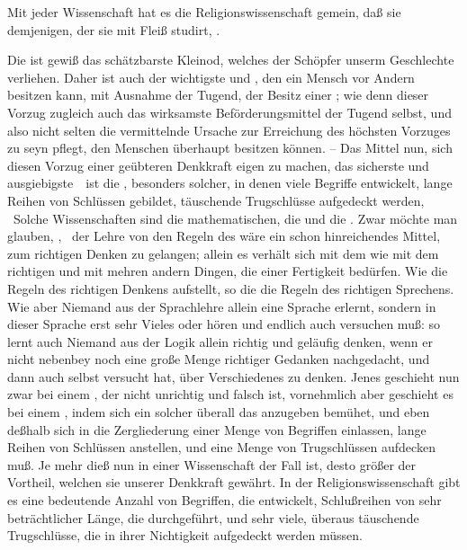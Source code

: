 \begin{aufza}
\item Mit jeder Wissenschaft hat es die Religionswissenschaft gemein, daß sie demjenigen, der sie mit Fleiß studirt, .
\begin{aufzb}
\item Die  ist gewiß das schätzbarste Kleinod, welches der Schöpfer unserm Geschlechte verliehen. Daher ist auch der wichtigste und , den ein Mensch vor Andern besitzen kann, mit Ausnahme der Tugend, der Besitz einer ; wie denn dieser Vorzug zugleich auch das wirksamste Beförderungsmittel der Tugend selbst, und also nicht selten die vermittelnde Ursache zur Erreichung des höchsten Vorzuges zu seyn pflegt, den Menschen überhaupt besitzen können. -- Das Mittel nun, sich diesen Vorzug einer geübteren Denkkraft eigen zu machen, das sicherste und ausgiebigste~\ ist die , besonders solcher, in denen viele Begriffe entwickelt, lange Reihen von Schlüssen gebildet, täuschende Trugschlüsse aufgedeckt werden, \usw\ Solche Wissenschaften sind die mathematischen, die  und die . Zwar möchte man glauben, , \dh\ der Lehre von den Regeln des  wäre ein schon hinreichendes Mittel, zum richtigen Denken zu gelangen; allein es verhält sich mit dem  wie mit dem richtigen  und mit mehren andern Dingen, die einer Fertigkeit bedürfen. Wie  die Regeln des richtigen Denkens aufstellt, so die  die Regeln des richtigen Sprechens. Wie aber Niemand aus der Sprachlehre allein eine Sprache erlernt, sondern in dieser Sprache erst sehr Vieles  oder hören und endlich auch  versuchen muß: so lernt auch Niemand aus der Logik allein richtig und geläufig denken, wenn er nicht nebenbey noch eine große Menge richtiger Gedanken  nachgedacht, und dann auch selbst versucht hat, über Verschiedenes zu denken. Jenes geschieht nun zwar bei einem , der nicht unrichtig und falsch ist, vornehmlich aber geschieht es bei einem , indem sich ein solcher überall das  anzugeben bemühet, und eben deßhalb sich in die Zergliederung einer Menge von Begriffen einlassen, lange Reihen von Schlüssen anstellen, und eine Menge von Trugschlüssen aufdecken muß. Je mehr dieß nun in einer Wissenschaft der Fall ist, desto größer der Vortheil, welchen sie unserer Denkkraft gewährt. In der Religionswissenschaft gibt es eine bedeutende Anzahl von Begriffen, die entwickelt, Schlußreihen von sehr beträchtlicher Länge, die durchgeführt, und sehr viele, überaus täuschende Trugschlüsse, die in ihrer Nichtigkeit aufgedeckt werden müssen.

\end{aufzb}
\end{aufza}

